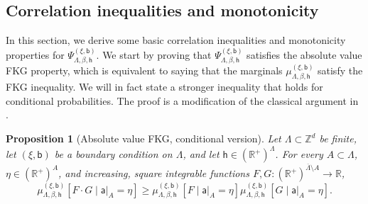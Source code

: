 \documentclass[11pt,a4paper]{article}
\newtheorem{proposition}[theorem]{Proposition}
\theoremstyle{definition}
\numberwithin{equation}{section}
\begin{document}
\subsection{Correlation inequalities and monotonicity}


In this section, we derive some basic correlation inequalities and monotonicity properties for $\Psi_{\Lambda,\beta,\mathsf{h}}^{(\xi,\mathsf{b})}$. We start by proving that $\Psi_{\Lambda,\beta,\mathsf{h}}^{(\xi,\mathsf{b})}$ satisfies the absolute value FKG property, which is equivalent to saying that the marginals $\mu^{(\xi,\mathsf b)}_{\Lambda, \beta, \mathsf h}$ satisfy the FKG inequality. We will in fact state a stronger inequality that holds for conditional probabilities. The proof is a modification of the classical argument in \cite[Theorem 4.4.1]{GlimmJaffeQuantumBOOK}.

\begin{proposition}[Absolute value FKG, conditional version]\label{prop: absolute value FKG}
Let $\Lambda\subset \mathbb{Z}^d$ be finite, let $(\xi,\mathsf{b})$ be a boundary condition on $\Lambda$, and let $\mathsf h\in (\mathbb{R}^+)^{\Lambda}$. For every  $A \subset \Lambda$, $\eta \in (\mathbb R^+)^A$, and increasing, square integrable functions $F,G: (\mathbb{R}^+)^{\overline{\Lambda} \setminus A}\to\mathbb{R}$, 
\begin{equation} \label{eq: conditional abs fkg}
\mu_{\Lambda,\beta,\mathsf{h}}^{(\xi,\mathsf{b})}[F\cdot G \mid \mathsf a|_A=\eta]\geq \mu_{\Lambda,\beta,\mathsf{h}}^{(\xi,\mathsf{b})}[F \mid \mathsf a|_A=\eta]\mu_{\Lambda,\beta,\mathsf{h}}^{(\xi,\mathsf{b})}[G \mid \mathsf a|_A=\eta].
\end{equation}
\end{proposition}
\end{document}
